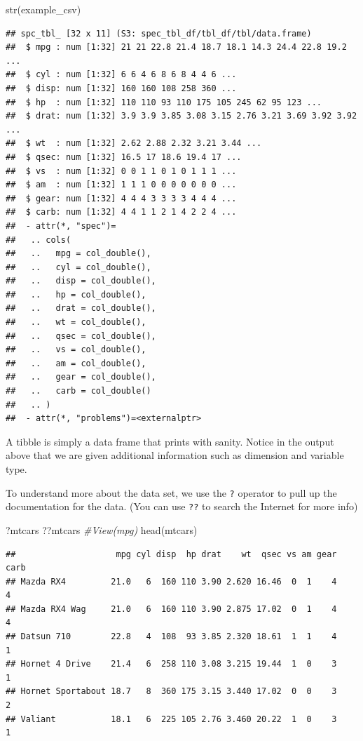 \documentclass[
]{book}
\newenvironment{Shaded}{\begin{snugshade}}{\end{snugshade}}
\newcommand{\CommentTok}[1]{\textcolor[rgb]{0.56,0.35,0.01}{\textit{#1}}}
\newcommand{\FunctionTok}[1]{\textcolor[rgb]{0.00,0.00,0.00}{#1}}
\newcommand{\NormalTok}[1]{#1}
\begin{document}
\begin{Shaded}
\begin{Highlighting}[]
\FunctionTok{str}\NormalTok{(example\_csv)}
\end{Highlighting}
\end{Shaded}

\begin{verbatim}
## spc_tbl_ [32 x 11] (S3: spec_tbl_df/tbl_df/tbl/data.frame)
##  $ mpg : num [1:32] 21 21 22.8 21.4 18.7 18.1 14.3 24.4 22.8 19.2 ...
##  $ cyl : num [1:32] 6 6 4 6 8 6 8 4 4 6 ...
##  $ disp: num [1:32] 160 160 108 258 360 ...
##  $ hp  : num [1:32] 110 110 93 110 175 105 245 62 95 123 ...
##  $ drat: num [1:32] 3.9 3.9 3.85 3.08 3.15 2.76 3.21 3.69 3.92 3.92 ...
##  $ wt  : num [1:32] 2.62 2.88 2.32 3.21 3.44 ...
##  $ qsec: num [1:32] 16.5 17 18.6 19.4 17 ...
##  $ vs  : num [1:32] 0 0 1 1 0 1 0 1 1 1 ...
##  $ am  : num [1:32] 1 1 1 0 0 0 0 0 0 0 ...
##  $ gear: num [1:32] 4 4 4 3 3 3 3 4 4 4 ...
##  $ carb: num [1:32] 4 4 1 1 2 1 4 2 2 4 ...
##  - attr(*, "spec")=
##   .. cols(
##   ..   mpg = col_double(),
##   ..   cyl = col_double(),
##   ..   disp = col_double(),
##   ..   hp = col_double(),
##   ..   drat = col_double(),
##   ..   wt = col_double(),
##   ..   qsec = col_double(),
##   ..   vs = col_double(),
##   ..   am = col_double(),
##   ..   gear = col_double(),
##   ..   carb = col_double()
##   .. )
##  - attr(*, "problems")=<externalptr>
\end{verbatim}

A tibble is simply a data frame that prints with sanity. Notice in the output above that we are given additional information such as dimension and variable type.

To understand more about the data set, we use the \texttt{?} operator to pull up the documentation for the data. (You can use \texttt{??} to search the Internet for more info)

\begin{Shaded}
\begin{Highlighting}[]
\NormalTok{?mtcars}
\NormalTok{??mtcars}
\CommentTok{\#View(mpg)}
\FunctionTok{head}\NormalTok{(mtcars)}
\end{Highlighting}
\end{Shaded}

\begin{verbatim}
##                    mpg cyl disp  hp drat    wt  qsec vs am gear carb
## Mazda RX4         21.0   6  160 110 3.90 2.620 16.46  0  1    4    4
## Mazda RX4 Wag     21.0   6  160 110 3.90 2.875 17.02  0  1    4    4
## Datsun 710        22.8   4  108  93 3.85 2.320 18.61  1  1    4    1
## Hornet 4 Drive    21.4   6  258 110 3.08 3.215 19.44  1  0    3    1
## Hornet Sportabout 18.7   8  360 175 3.15 3.440 17.02  0  0    3    2
## Valiant           18.1   6  225 105 2.76 3.460 20.22  1  0    3    1
\end{verbatim}
\end{document}
